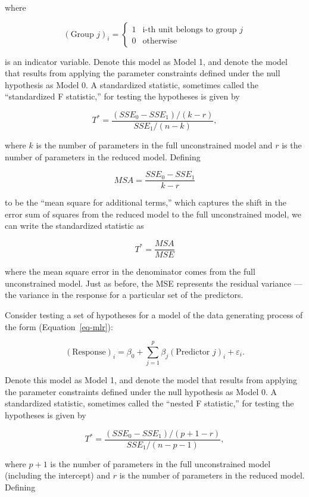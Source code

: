\documentclass[
  letterpaper,
  DIV=11,
  numbers=noendperiod]{scrreprt}
\providecommand{\tightlist}{%
  \setlength{\itemsep}{0pt}\setlength{\parskip}{0pt}}\usepackage{longtable,booktabs,array}
\theoremstyle{definition}
\theoremstyle{definition}
\theoremstyle{plain}
\theoremstyle{remark}
\begin{document}
where

\[(\text{Group } j)_i = \begin{cases} 1 & \text{i-th unit belongs to group } j \\ 0 & \text{otherwise} \end{cases}\]

is an indicator variable. Denote this model as Model 1, and denote the
model that results from applying the parameter constraints defined under
the null hypothesis as Model 0. A standardized statistic, sometimes
called the ``standardized F statistic,'' for testing the hypotheses is
given by

\[T^* = \frac{\left(SSE_0 - SSE_1\right) / (k - r)}{SSE_1 / (n - k)},\]

where \(k\) is the number of parameters in the full unconstrained model
and \(r\) is the number of parameters in the reduced model. Defining

\[MSA = \frac{SSE_0 - SSE_1}{k - r}\]

to be the ``mean square for additional terms,'' which captures the shift
in the error sum of squares from the reduced model to the full
unconstrained model, we can write the standardized statistic as

\[T^* = \frac{MSA}{MSE}\]

where the mean square error in the denominator comes from the full
unconstrained model. Just as before, the MSE represents the residual
variance --- the variance in the response for a particular set of the
predictors.

\begin{description}
\tightlist
\item[Standardized Statistic for General Linear Model
(Definition~\ref{def-general-f})]
Consider testing a set of hypotheses for a model of the data generating
process of the form (Equation~\ref{eq-mlr}):
\end{description}

\[(\text{Response})_i = \beta_0 + \sum_{j=1}^{p} \beta_j(\text{Predictor } j)_i + \varepsilon_i.\]

Denote this model as Model 1, and denote the model that results from
applying the parameter constraints defined under the null hypothesis as
Model 0. A standardized statistic, sometimes called the ``nested F
statistic,'' for testing the hypotheses is given by

\[T^* = \frac{\left(SSE_0 - SSE_1\right) / (p + 1 - r)}{SSE_1 / (n - p - 1)},\]

where \(p + 1\) is the number of parameters in the full unconstrained
model (including the intercept) and \(r\) is the number of parameters in
the reduced model. Defining
\end{document}
